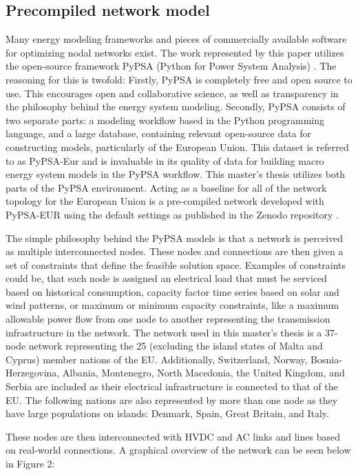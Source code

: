 \documentclass[preprint,12pt,nopreprintline]{elsarticle}
\begin{document}
\subsection{Precompiled network model}
\noindent
Many energy modeling frameworks and pieces of commercially available software for optimizing nodal networks exist. The work represented by this paper utilizes the open-source framework PyPSA (Python for Power System Analysis) \cite{PyPSA}. The reasoning for this is twofold: Firstly, PyPSA is completely free and open source to use. This encourages open and collaborative science, as well as transparency in the philosophy behind the energy system modeling. Secondly, PyPSA consists of two separate parts: a modeling workflow based in the Python programming language, and a large database, containing relevant open-source data for constructing models, particularly of the European Union. This dataset is referred to as PyPSA-Eur\cite{PyPSAEur} and is invaluable in its quality of data for building macro energy system models in the PyPSA workflow. This master's thesis utilizes both parts of the PyPSA environment. Acting as a baseline for all of the network topology for the European Union is a pre-compiled network developed with PyPSA-EUR using the default settings as published in the Zenodo repository \cite{horschPyPSAEurOpenOptimisation2023}.

\medskip
\noindent The simple philosophy behind the PyPSA models is that a network is perceived as multiple interconnected nodes. These nodes and connections are then given a set of constraints that define the feasible solution space. Examples of constraints could be, that each node is assigned an electrical load that must be serviced based on historical consumption, capacity factor time series based on solar and wind patterns, or maximum or minimum capacity constraints, like a maximum allowable power flow from one node to another representing the transmission infrastructure in the network. The network used in this master's thesis is a 37-node network representing the 25 (excluding the island states of Malta and Cyprus) member nations of the EU. Additionally, Switzerland, Norway, Bosnia-Herzegovina, Albania, Montenegro, North Macedonia, the United Kingdom, and Serbia are included as their electrical infrastructure is connected to that of the EU. The following nations are also represented by more than one node as they have large populations on islands: Denmark, Spain, Great Britain, and Italy.

\medskip
\noindent These nodes are then interconnected with HVDC and AC links and lines based on real-world connections. A graphical overview of the network can be seen below in Figure 2:
\end{document}
